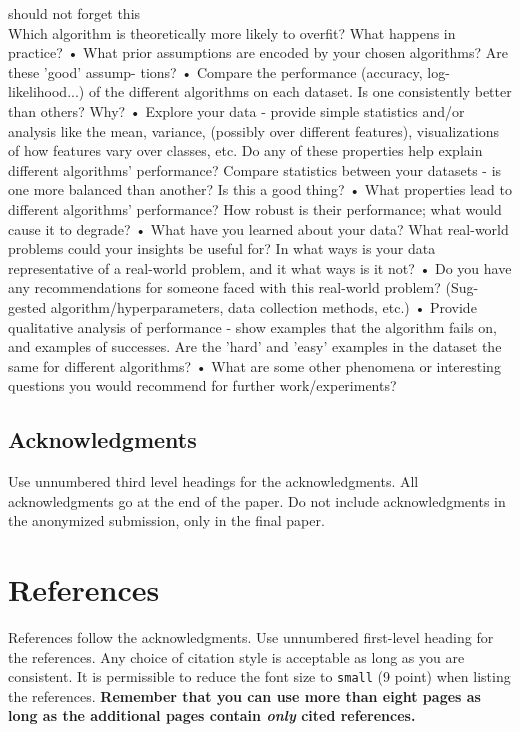 \documentclass{article}
\begin{document}
should not forget this\\
Which algorithm is theoretically more likely to overfit? What happens in practice?
•
What prior assumptions are encoded by your chosen algorithms? Are these ’good’ assump-
tions?
•
Compare the performance (accuracy, log-likelihood...) of the different algorithms on each
dataset. Is one consistently better than others? Why?
•
Explore your data - provide simple statistics and/or analysis like the mean, variance, (possibly
over different features), visualizations of how features vary over classes, etc. Do any of these
properties help explain different algorithms’ performance? Compare statistics between your
datasets - is one more balanced than another? Is this a good thing?
•
What properties lead to different algorithms’ performance? How robust is their performance;
what would cause it to degrade?
•
What have you learned about your data? What real-world problems could your insights be
useful for? In what ways is your data representative of a real-world problem, and it what
ways is it not?
•
Do you have any recommendations for someone faced with this real-world problem? (Sug-
gested algorithm/hyperparameters, data collection methods, etc.)
•
Provide qualitative analysis of performance - show examples that the algorithm fails on, and
examples of successes. Are the ’hard’ and ’easy’ examples in the dataset the same for different
algorithms?
•
What are some other phenomena or interesting questions you would recommend for further
work/experiments?
\subsection*{Acknowledgments}

Use unnumbered third level headings for the acknowledgments. All acknowledgments
go at the end of the paper. Do not include acknowledgments in the anonymized
submission, only in the final paper.

\section*{References}

References follow the acknowledgments. Use unnumbered first-level heading for
the references. Any choice of citation style is acceptable as long as you are
consistent. It is permissible to reduce the font size to \verb+small+ (9 point)
when listing the references. {\bf Remember that you can use more than eight
  pages as long as the additional pages contain \emph{only} cited references.}
\medskip
\end{document}
